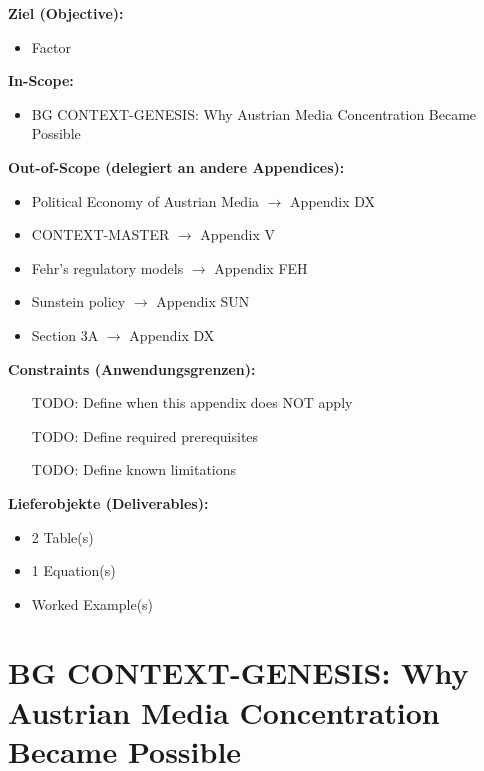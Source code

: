 \begin{tcolorbox}[
    colback=orange!5!white,
    colframe=orange!75!black,
    title={\textbf{Appendix Scope: Ziel / In-Scope / Out-of-Scope / Constraints}},
    fonttitle=\bfseries
]

\textbf{Ziel (Objective):}
\begin{itemize}[nosep]
    \item Factor
\end{itemize}

\textbf{In-Scope:}
\begin{itemize}[nosep]
    \item BG CONTEXT-GENESIS: Why Austrian Media Concentration Became Possible
\end{itemize}

\textbf{Out-of-Scope (delegiert an andere Appendices):}
\begin{itemize}[nosep]
    \item Political Economy of Austrian Media $\rightarrow$ Appendix DX
    \item CONTEXT-MASTER $\rightarrow$ Appendix V
    \item Fehr's regulatory models $\rightarrow$ Appendix FEH
    \item Sunstein policy $\rightarrow$ Appendix SUN
    \item Section 3A $\rightarrow$ Appendix DX
\end{itemize}

\textbf{Constraints (Anwendungsgrenzen):}
\begin{itemize}[nosep]
    \item [TODO: Define when this appendix does NOT apply]
    \item [TODO: Define required prerequisites]
    \item [TODO: Define known limitations]
\end{itemize}

\textbf{Lieferobjekte (Deliverables):}
\begin{itemize}[nosep]
    \item 2 Table(s)
    \item 1 Equation(s)
    \item Worked Example(s)
\end{itemize}

\end{tcolorbox}


\section{BG CONTEXT-GENESIS: Why Austrian Media Concentration Became Possible}
\label{app:bg-context-genesis}

